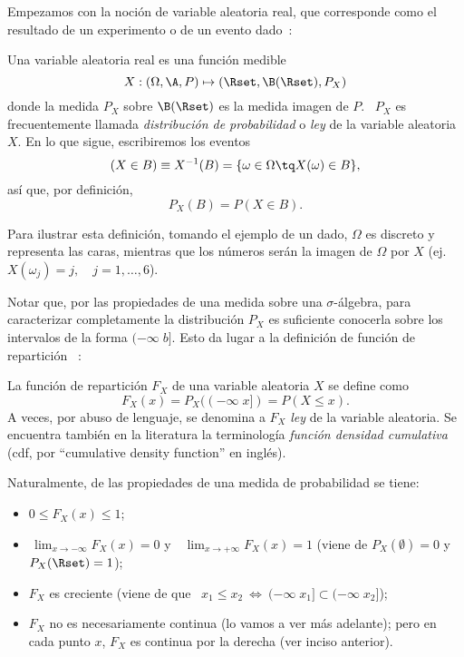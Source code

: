 Empezamos con  la noci\'on de variable  aleatoria real, que  corresponde como el
resultado de un experimento o de un evento dado~\cite{AshDol99, AthLah06, Coh13,
  Bre88}:
%
\begin{definicion}
\label{Def:MP:VariableAleatotiaReal}
%
  Una variable aleatoria real es una funci\'on medible
  \[
  X: (\Omega,\A,P) \mapsto (\Rset,\B(\Rset),P_X)
  \]
  donde la medida  $P_X$ sobre $\B(\Rset)$ es la medida imagen  de $P$.  \ $P_X$
  es frecuentemente llamada {\it distribuci\'on  de probabilidad} o {\it ley} de
  la variable aleatoria $X$. En lo que sigue, escribiremos  los eventos
  \[
  (X \in B) \equiv X^{-1}(B) = \{ \omega \in \Omega \tq X(\omega) \in B \},
  \]
  as\'i que, por definici\'on,
  \[
  P_X(B) = P(X \in B).
  \]
\end{definicion}
%
Para  ilustrar esta definici\'on,  tomando el  ejemplo de  un dado,  $\Omega$ es
discreto y representa las caras,  mientras que los n\'umeros    ser\'an  la  imagen  de  $\Omega$  por  $X$
(ej. $X(\omega_j) = j, \quad j = 1, \ldots , 6$).

Notar que, por las propiedades  de una medida sobre una $\sigma$-\'algebra, para
caracterizar completamente la distribuci\'on $P_X$ es suficiente conocerla sobre
los intervalos de la forma $(-\infty \; b]$.  Esto da lugar a la definici\'on de
funci\'on de repartici\'on ~\cite{AshDol99, AthLah06, Coh13, Bre88, HogMck13}:
%
\begin{definicion}
\label{Def:MP:FuncionReparticion}
%
La funci\'on de repartici\'on $F_X$ de una variable aleatoria $X$ se define como
  \[
  F_X(x) = P_X((-\infty \; x]) = P(X \le x).
  \]
  A veces, por abuso  de lenguaje, se denomina a $F_X$ {\it  ley} de la variable
  aleatoria.  Se encuentra  tambi\'en en  la literatura  la  terminolog\'ia {\it
    funci\'on densidad cumulativa} (cdf,  por ``cumulative density function'' en
  ingl\'es).
\end{definicion}
%
Naturalmente, de las propiedades de una medida de probabilidad se tiene:
%
\begin{itemize}
\item $0 \le F_X(x) \le 1$;
%
\item $\displaystyle \, \lim_{x \to -\infty} F_X(x) = 0$ y \ $\displaystyle \,
  \lim_{x \to +\infty} F_X(x) = 1$  (viene de $P_X(\emptyset) = 0$ y $P_X(\Rset)
  = 1$);
%
\item $F_X$ es creciente \big(viene de  que \ $x_1 \le x_2 \: \Leftrightarrow \:
  (-\infty \; x_1] \subset (-\infty \; x_2]$\big);
%
\item $F_X$ no es necesariamente continua  (lo vamos a ver m\'as adelante); pero
  en cada punto $x$, $F_X$ es continua por la derecha (ver inciso anterior).
\end{itemize}


